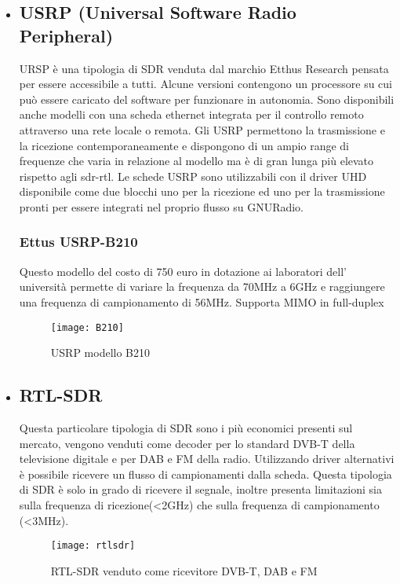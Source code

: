 \begin{itemize}
\item \subsection{USRP (Universal Software Radio Peripheral)} URSP è una tipologia di SDR venduta dal marchio Etthus Research pensata per essere accessibile a tutti. Alcune versioni contengono un processore su cui può essere caricato del software per funzionare in autonomia. Sono disponibili anche modelli con una scheda ethernet integrata per il controllo remoto attraverso una rete locale o remota. Gli USRP permettono la trasmissione e la ricezione contemporaneamente e dispongono di un ampio range di frequenze che varia in relazione al modello ma è di gran lunga più elevato rispetto agli sdr-rtl. Le schede USRP sono utilizzabili con il driver UHD disponibile come due blocchi uno per la ricezione ed uno per la trasmissione pronti per essere integrati nel proprio flusso su GNURadio.
\subsubsection{Ettus USRP-B210}
Questo modello del costo di 750 euro in dotazione ai laboratori dell' università permette di variare la frequenza da 70MHz a 6GHz e raggiungere una frequenza di campionamento di 56MHz. Supporta MIMO in full-duplex
\begin{figure}[h]
	\centering
	\texttt{[image: B210]}
	\caption{USRP modello B210\cite{b210}}\label{fig:1}
\end{figure}


\item \subsection{RTL-SDR} Questa particolare tipologia di SDR sono i più economici presenti sul mercato, vengono venduti come decoder per lo standard DVB-T della televisione digitale e per DAB e FM della radio. Utilizzando driver alternativi è possibile ricevere un flusso di campionamenti dalla scheda. Questa tipologia di SDR è solo in grado di ricevere il segnale, inoltre presenta limitazioni sia sulla frequenza di ricezione(<2GHz) che sulla frequenza di campionamento (<3MHz).
\begin{figure}[h]
	\centering
	\texttt{[image: rtlsdr]}
	\caption{RTL-SDR venduto come ricevitore DVB-T, DAB e FM\cite{rtlsdr}}\label{fig:1}
\end{figure}


\end{itemize}
